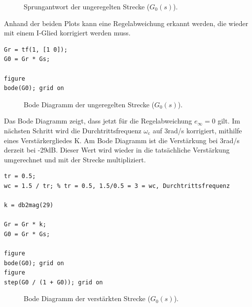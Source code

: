 \documentclass[11pt,a4paper]{article}
\newlength\figureheight
\newlength\figurewidth
\begin{document}
\begin{figure}[H]
    \centering
    \setlength\figureheight{6cm}
    \setlength{} %
    
    
    
    \caption{Sprungantwort der ungeregelten Strecke ($G_{\mathrm{0}}(s)$).}
    \label{fig:matlab_plot7}
\end{figure}

\noindent Anhand der beiden Plots kann eine Regelabweichung erkannt werden, die wieder mit einem I-Glied korrigiert werden muss.

\begin{lstlisting}
Gr = tf(1, [1 0]);
G0 = Gr * Gs;

figure 
bode(G0); grid on
\end{lstlisting}

\begin{figure}[H]
    \centering
    \setlength\figureheight{6cm}
    \setlength{} %
    
    
    
    \caption{Bode Diagramm der ungeregelten Strecke ($G_{\mathrm{0}}(s)$).}
    \label{fig:matlab_plot8}
\end{figure}

\noindent Das Bode Diagramm zeigt, dass jetzt für die Regelabweichung $e_{\mathrm{\infty}} = 0$ gilt. Im nächsten Schritt wird die Durchtrittsfrequenz $\omega_{\mathrm{c}}$ auf 3rad/s korrigiert, mithilfe eines Verstärkergliedes K. Am Bode Diagramm ist die Verstärkung bei 3rad/s derzeit bei -29dB. Dieser Wert wird wieder in die tatsächliche Verstärkung umgerechnet und mit der Strecke multipliziert.

\begin{lstlisting}
tr = 0.5;
wc = 1.5 / tr; % tr = 0.5, 1.5/0.5 = 3 = wc, Durchtrittsfrequenz

k = db2mag(29)

Gr = Gr * k;
G0 = Gr * Gs;

figure
bode(G0); grid on 
figure
step(G0 / (1 + G0)); grid on 
\end{lstlisting}

\begin{figure}[H]
    \centering
    \setlength\figureheight{6cm}
    \setlength{} %
    
    
    
    \caption{Bode Diagramm der verstärkten Strecke ($G_{\mathrm{0}}(s)$).}
    \label{fig:matlab_plot9}
\end{figure}
\end{document}

